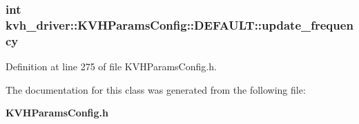 \subsubsection[{update\-\_\-frequency}]{\setlength{\rightskip}{0pt plus 5cm}int {\bf kvh\-\_\-driver\-::\-K\-V\-H\-Params\-Config\-::\-D\-E\-F\-A\-U\-L\-T\-::update\-\_\-frequency}}\label{classkvh__driver_1_1KVHParamsConfig_1_1DEFAULT_a6d0835a827090212bd9abf95da7a247c}


\-Definition at line 275 of file \-K\-V\-H\-Params\-Config.\-h.



\-The documentation for this class was generated from the following file\-:\begin{DoxyCompactItemize}
\item 
{\bf \-K\-V\-H\-Params\-Config.\-h}\end{DoxyCompactItemize}
